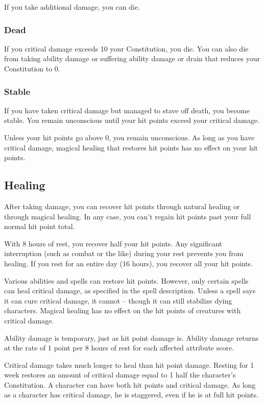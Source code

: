 If you take additional damage, you can die. 

\subsubsection{Dead}
If you critical damage exceeds 10 \add your Constitution, you die. You can also die from taking ability damage or suffering ability damage or drain that reduces your Constitution to 0.

\subsubsection{Stable}
If you have taken critical damage but managed to stave off death, you become stable. You remain unconscious until your hit points exceed your critical damage.

Unless your hit points go above 0, you remain unconscious. As long as you have critical damage, magical healing that restores hit points has no effect on your hit points.

\subsection{Healing}
After taking damage, you can recover hit points through natural healing or through magical healing. In any case, you can't regain hit points past your full normal hit point total.

 With 8 hours of rest, you recover half your hit points. Any significant interruption (such as combat or the like) during your rest prevents you from healing. If you rest for an entire day (16 hours), you recover all your hit points.

 Various abilities and spells can restore hit points. However, only certain spells can heal critical damage, as specified in the spell description. Unless a spell says it can cure critical damage, it cannot -- though it can still stabilize dying characters. Magical healing has no effect on the hit points of creatures with critical damage.

 Ability damage is temporary, just as hit point damage is. Ability damage returns at the rate of 1 point per 8 hours of rest for each affected attribute score.

 Critical damage takes much longer to heal than hit point damage. Resting for 1 week restores an amount of critical damage equal to 1 \add half the character's Constitution. A character can have both hit points and critical damage. As long as a character has critical damage, he is staggered, even if he is at full hit points.

